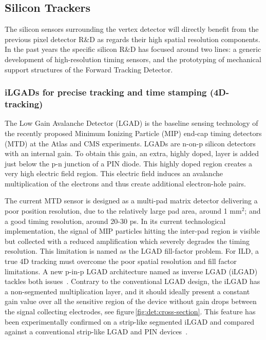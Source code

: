 \subsection{Silicon Trackers}

The silicon sensors surrounding the vertex detector will directly benefit from the previous pixel detector R\&D as regards their high spatial resolution components. In the past years the specific silicon R\&D has focused around two lines: a generic development of high-resolution timing sensors, and the prototyping of mechanical support structures of the Forward Tracking Detector.

\subsubsection{iLGADs for precise tracking and time stamping (4D-tracking)}

The Low Gain Avalanche Detector (LGAD) is the baseline sensing technology of the recently proposed Minimum Ionizing Particle (MIP) end-cap timing detectors (MTD) at the Atlas and CMS experiments. LGADs are n-on-p silicon detectors with an internal gain. To obtain this gain, an extra, highly doped, layer is added just below the p-n junction of a PIN diode. This highly doped region creates a very high electric field region. This electric field induces an avalanche multiplication of the electrons and thus create additional electron-hole pairs\cite{PELLEGRINI201412}. 

The current MTD sensor is designed as a multi-pad matrix detector delivering a poor position resolution, due to the relatively large pad area, around 1 mm$^2$; and a good timing resolution, around 20-30 ps. In its current technological implementation, the signal of MIP particles hitting the inter-pad region is visible but collected with a reduced amplification which severely degrades the timing resolution. This limitation is named as the LGAD fill-factor problem. For ILD, a true 4D tracking  must overcome the poor spatial resolution and fill factor limitations. A new p-in-p LGAD architecture named as inverse LGAD (iLGAD) tackles both issues~\cite{Carulla_2016}. Contrary to the conventional LGAD design, the iLGAD has a non-segmented multiplication layer, and it should ideally present a constant gain value over all the sensitive region of the device without gain drops between the signal collecting electrodes, see figure\,\ref{fig:det:cross-section}. This feature has been experimentally confirmed on a strip-like segmented iLGAD and compared against a conventional strip-like LGAD and PIN devices~\cite{Curras2019}. 


